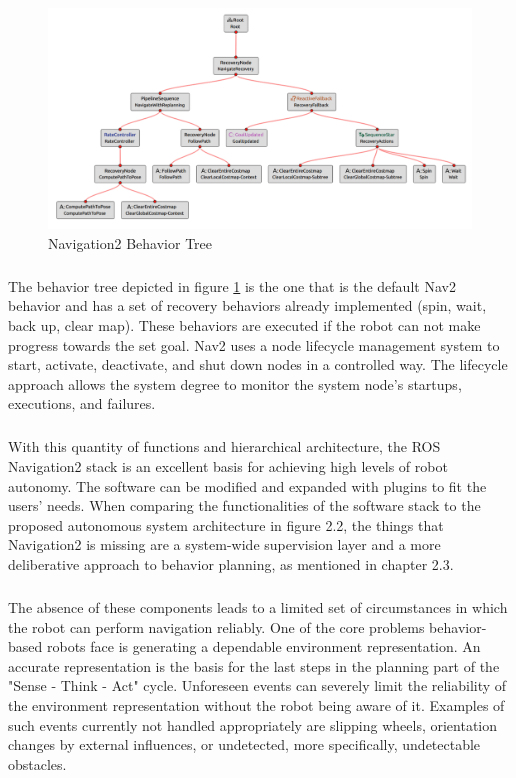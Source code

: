 \begin{figure}[ht]
	\includegraphics[width=1.0\textwidth]{images/nav_bt-modified.png}
	\caption{Navigation2 Behavior Tree}
	\label{fig:bt_nav}
\end{figure}
\subparagraph*{}
The behavior tree depicted in figure \ref{fig:bt_nav} is the one that is the default Nav2 behavior and has a set of recovery behaviors already implemented (spin, wait, back up, clear map). These behaviors are executed if the robot can not make progress towards the set goal. 
Nav2 uses a node lifecycle management system to start, activate, deactivate, and shut down nodes in a controlled way. The lifecycle approach allows the system degree to monitor the system node's startups, executions, and failures. 
\subparagraph*{}
With this quantity of functions and hierarchical architecture, the ROS Navigation2 stack is an excellent basis for achieving high levels of robot autonomy. The software can be modified and expanded with plugins to fit the users' needs. 
When comparing the functionalities of the software stack to the proposed autonomous system architecture in figure 2.2, the things that Navigation2 is missing are a system-wide supervision layer and a more deliberative approach to behavior planning, as mentioned in chapter 2.3.
\subparagraph*{}
The absence of these components leads to a limited set of circumstances in which the robot can perform navigation reliably. One of the core problems behavior-based robots face is generating a dependable environment representation. An accurate representation is the basis for the last steps in the planning part of the "Sense - Think - Act" cycle. Unforeseen events can severely limit the reliability of the environment representation without the robot being aware of it. Examples of such events currently not handled appropriately are slipping wheels, orientation changes by external influences, or undetected, more specifically, undetectable obstacles. 
